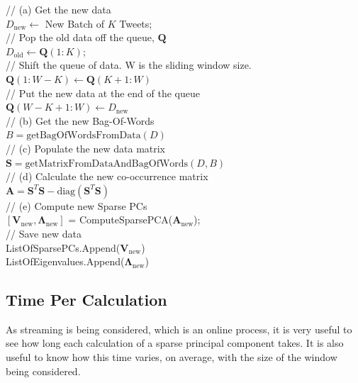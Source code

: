 \documentclass[11pt,a4paper]{article}
\newcommand{\smat}{\mathbf{S}}
\newcommand{\covmat}{\mathbf{A}}
\newcommand{\tp}{^T}
\begin{document}
\LinesNumbered
\begin{algorithm}[H]
 {
//  (a) Get the new data\\
$D_\text{new} \leftarrow $ New Batch of $K$ Tweets;\\
// Pop the old data off the queue, $\mathbf{Q}$\\
$D_\text{old} \leftarrow \mathbf{Q}(1:K)$;\\
// Shift the queue of data. W is the sliding window size.\\
$ \mathbf{Q}(1:W-K) \leftarrow \mathbf{Q}(K+1:W) $\\
// Put the new data at the end of the queue\\
$ \mathbf{Q}(W-K+1:W) \leftarrow D_\text{new}$\\
// (b) Get the new Bag-Of-Words\\
$ B = \text{getBagOfWordsFromData}(D)$\\
// (c) Populate the new data matrix \\
$\smat = \text{getMatrixFromDataAndBagOfWords}(D, B)$\\
// (d) Calculate the new co-occurrence matrix\\
$\covmat = \smat\tp \smat - \text{diag}(\smat\tp \smat) $\\
// (e) Compute new Sparse PCs \\
$[\mathbf{V}_\text{new}, \mathbf{\Lambda}_\text{new}]$ = ComputeSparsePCA($\covmat_\text{new}$);\\
// Save new data\\
ListOfSparsePCs.Append($\mathbf{V}_\text{new}$)\\
ListOfEigenvalues.Append($\mathbf{\Lambda}_\text{new}$)\\

}
\end{algorithm}

\subsection{Time Per Calculation}
As streaming is being considered, which is an online process, it is very useful to see how long each calculation of a sparse principal component takes. It is also useful to know how this time varies, on average, with the size of the window being considered.
\end{document}
